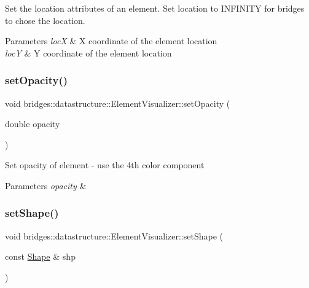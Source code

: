 Set the location attributes of an element. Set location to I\+N\+F\+I\+N\+I\+TY for bridges to chose the location.


\begin{DoxyParams}{Parameters}
{\em locX} & X coordinate of the element location \\
\hline
{\em locY} & Y coordinate of the element location \\
\hline
\end{DoxyParams}
\mbox{\label{classbridges_1_1datastructure_1_1_element_visualizer_a03f0ba203affb77d4ba8d2f1a6b1eea0}} 
\subsubsection{\texorpdfstring{setOpacity()}{setOpacity()}}
{\footnotesize\ttfamily void bridges\+::datastructure\+::\+Element\+Visualizer\+::set\+Opacity (\begin{DoxyParamCaption}\item[{double}]{opacity }\end{DoxyParamCaption})\hspace{0.3cm}{\ttfamily [inline]}}

Set opacity of element -\/ use the 4th color component


\begin{DoxyParams}{Parameters}
{\em opacity} & \\
\hline
\end{DoxyParams}
\mbox{\label{classbridges_1_1datastructure_1_1_element_visualizer_a316cccfc1e75ccbfdfe6d68da824b8b3}} 
\subsubsection{\texorpdfstring{setShape()}{setShape()}}
{\footnotesize\ttfamily void bridges\+::datastructure\+::\+Element\+Visualizer\+::set\+Shape (\begin{DoxyParamCaption}\item[{const \mbox{\hyperlink{namespacebridges_1_1datastructure_a3408f5f44d9c6062e5f3adb7e1bbb7f0}{Shape}} \&}]{shp }\end{DoxyParamCaption})\hspace{0.3cm}{\ttfamily [inline]}}



